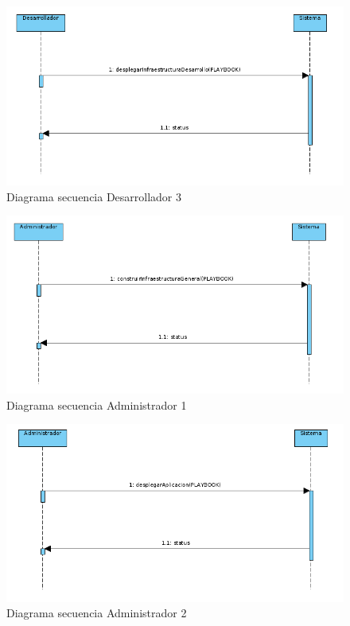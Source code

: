 		\begin{figure}[!hbt]
			\centering
			\includegraphics[scale=0.4]{imagenes/Analisis/diagrama_secuencia_desarrollador_3.png}
			\caption[Diagrama secuencia Desarrollador 3]{Diagrama secuencia Desarrollador 3 \cite{diagramasecuencia:online}} 
			\label{Diagrama secuencia_desarrollador_3}
		\end{figure}
	
		\begin{figure}[!hbt]
			\centering
			\includegraphics[scale=0.4]{imagenes/Analisis/diagrama_secuencia_administrador_1.png}
			\caption[Diagrama secuencia Administrador 1]{Diagrama secuencia Administrador 1 \cite{diagramasecuencia:online}}
			\label{Diagrama secuencia_administrador_1}
		\end{figure}
		\clearpage
		
		\begin{figure}[!hbt]
			\centering
			\includegraphics[scale=0.4]{imagenes/Analisis/diagrama_secuencia_administrador_2.png}
			\caption[Diagrama secuencia Administrador 2]{Diagrama secuencia Administrador 2 \cite{diagramasecuencia:online}}
			\label{Diagrama secuencia_administrador_2}
		\end{figure}
	
